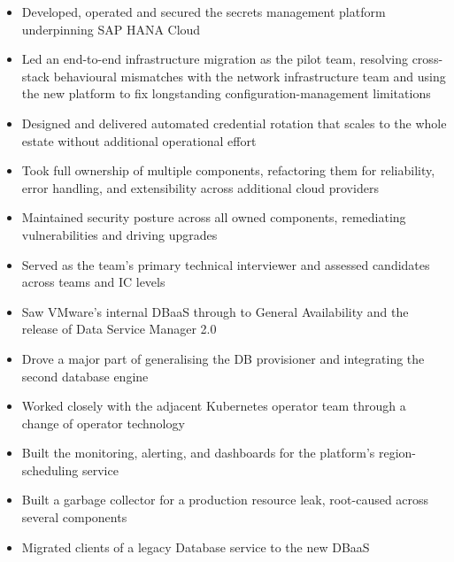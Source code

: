 \documentclass[10pt,a4paper,ragged2e,withhyper]{altacv}
\begin{document}


\makecvheader



\begin{itemize}
\item Developed, operated and secured the secrets management platform underpinning SAP HANA Cloud
\item Led an end-to-end infrastructure migration as the pilot team, resolving cross-stack behavioural mismatches with the network infrastructure team and using the new platform to fix longstanding configuration-management limitations
\item Designed and delivered automated credential rotation that scales to the whole estate without additional operational effort
\item Took full ownership of multiple components, refactoring them for reliability, error handling, and extensibility across additional cloud providers
\item Maintained security posture across all owned components, remediating vulnerabilities and driving upgrades
\item Served as the team's primary technical interviewer and assessed candidates across teams and IC levels
\end{itemize}
\divider

\begin{itemize}
\item Saw VMware's internal DBaaS through to General Availability and the release of Data Service Manager 2.0
\item Drove a major part of generalising the DB provisioner and integrating the second database engine
\item Worked closely with the adjacent Kubernetes operator team through a change of operator technology
\item Built the monitoring, alerting, and dashboards for the platform's region-scheduling service
\item Built a garbage collector for a production resource leak, root-caused across several components
\item Migrated clients of a legacy Database service to the new DBaaS
\end{itemize}
\divider
\end{document}
